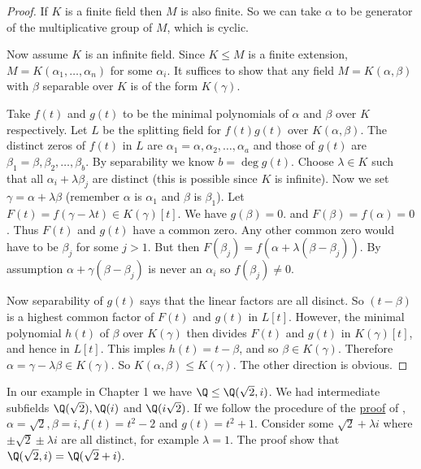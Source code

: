 \documentclass[a4paper]{article}
\begin{document}
\begin{proof}
  \label{proof:primitive}
  If \(K\) is a finite field then \(M\) is also finite. So we can take \(\alpha\) to be generator of the multiplicative group of \(M\), which is cyclic.

  Now assume \(K\) is an infinite field. Since \(K \leq M\) is a finite extension, \(M = K(\alpha_1, \dots, \alpha_n)\) for some \(\alpha_i\). It suffices to show that any field \(M = K(\alpha, \beta)\) with \(\beta\) separable over \(K\) is of the form \(K(\gamma)\).

  Take \(f(t)\) and \(g(t)\) to be the minimal polynomials of \(\alpha\) and \(\beta\) over \(K\) respectively. Let \(L\) be the splitting field for \(f(t)g(t)\) over \(K(\alpha, \beta)\). The distinct zeros of \(f(t)\) in \(L\) are \(\alpha_1 = \alpha, \alpha_2, \dots, \alpha_a\) and those of \(g(t)\) are \(\beta_1 = \beta, \beta_2, \dots, \beta_b\). By separability we know \(b = \deg g(t)\). Choose \(\lambda \in K\) such that all \(\alpha_i + \lambda \beta_j\) are distinct (this is possible since \(K\) is infinite). Now we set \(\gamma = \alpha + \lambda \beta\) (remember \(\alpha\) is \(\alpha_1\) and \(\beta\) is \(\beta_1\)). Let \(F(t) = f(\gamma - \lambda t) \in K(\gamma)[t]\). We have \(g(\beta) = 0\). and \(F(\beta) = f(\alpha) = 0\). Thus \(F(t)\) and \(g(t)\) have a common zero. Any other common zero would have to be \(\beta_j\) for some \(j > 1\). But then \(F(\beta_j) = f(\alpha + \lambda(\beta - \beta_j))\). By assumption \(\alpha + \gamma(\beta - \beta_j)\) is never an \(\alpha_i\) so \(f(\beta_j) \neq 0\).

  Now separability of \(g(t)\) says that the linear factors are all disinct. So \((t - \beta)\) is a highest common factor of \(F(t)\) and \(g(t)\) in \(L[t]\). However, the minimal polynomial \(h(t)\) of \(\beta\) over \(K(\gamma)\) then divides \(F(t)\) and \(g(t)\) in \(K(\gamma)[t]\), and hence in \(L[t]\). This imples \(h(t) = t - \beta\), and so \(\beta \in K(\gamma)\). Therefore \(\alpha = \gamma - \lambda \beta \in K(\gamma)\). So \(K(\alpha, \beta) \leq K(\gamma)\). The other direction is obvious.
\end{proof}

\begin{ex}
  In our example in Chapter 1  we have \(\Q \leq \Q(\sqrt 2, i)\). We had intermediate subfields \(\Q(\sqrt 2), \Q(i)\) and \(\Q(i\sqrt 2)\). If we follow the procedure of the \hyperref[proof:primitive]{proof} of , \(\alpha = \sqrt 2, \beta = i, f(t) = t^2 - 2\) and \(g(t) = t^2 + 1\). Consider some \(\sqrt 2 + \lambda i\) where \(\pm \sqrt 2 \pm \lambda i\) are all distinct, for example \(\lambda = 1\). The proof show that \(\Q(\sqrt 2, i) = \Q(\sqrt 2 + i)\).
\end{ex}
\end{document}
